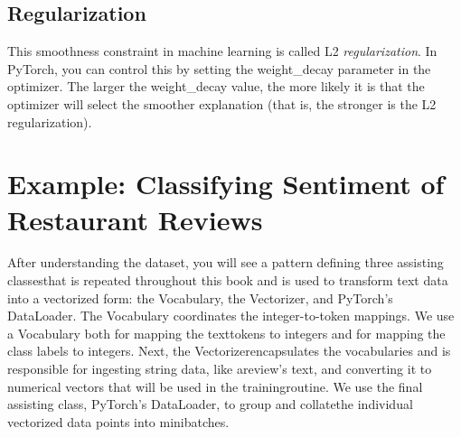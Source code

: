 \subsection{Regularization}
This smoothness constraint in machine learning is called L2 \textit{regularization}. In
PyTorch, you can control this by setting the weight\_decay parameter in the optimizer. The larger the weight\_decay value, the more likely it is that the optimizer will
select the smoother explanation (that is, the stronger is the L2 regularization).

\section{Example: Classifying Sentiment of Restaurant Reviews}
After understanding the dataset, you will see a pattern defining three assisting classesthat is repeated throughout this book and is used to transform text data into a vectorized form: the \textsf{Vocabulary}, the \textsf{Vectorizer}, and PyTorch's \textsf{DataLoader}. The Vocabulary coordinates the integer-to-token mappings. We use a Vocabulary both for mapping the texttokens to integers and for mapping the class labels to integers. Next, the Vectorizerencapsulates the vocabularies and is responsible for ingesting string data, like areview's text, and converting it to numerical vectors that will be used in the trainingroutine. We use the final assisting class, PyTorch's DataLoader, to group and collatethe individual vectorized data points into minibatches.